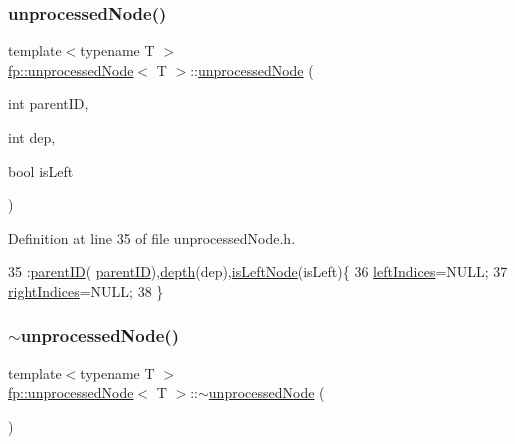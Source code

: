 \subsubsection{\texorpdfstring{unprocessed\+Node()}{unprocessedNode()}\hspace{0.1cm}{\footnotesize\ttfamily [2/4]}}
{\footnotesize\ttfamily template$<$typename T $>$ \\
\hyperlink{classfp_1_1unprocessedNode}{fp\+::unprocessed\+Node}$<$ T $>$\+::\hyperlink{classfp_1_1unprocessedNode}{unprocessed\+Node} (\begin{DoxyParamCaption}\item[{int}]{parent\+ID,  }\item[{int}]{dep,  }\item[{bool}]{is\+Left }\end{DoxyParamCaption})\hspace{0.3cm}{\ttfamily [inline]}}



Definition at line 35 of file unprocessed\+Node.\+h.


\begin{DoxyCode}
35                                                                    :\hyperlink{classfp_1_1unprocessedNode_a74cb75f76c24622444e531a583b75c3d}{parentID}(
      \hyperlink{classfp_1_1unprocessedNode_a74cb75f76c24622444e531a583b75c3d}{parentID}),\hyperlink{classfp_1_1unprocessedNode_a22ebfbc35a57e2d30b81220c94f4d0d3}{depth}(dep),\hyperlink{classfp_1_1unprocessedNode_a81b74c36ed1ac15d367e135e2fa0ba3d}{isLeftNode}(isLeft)\{
36                     \hyperlink{classfp_1_1unprocessedNode_a8e39fa0144bbb78fd02d1973bd05b5f6}{leftIndices}=NULL;
37                     \hyperlink{classfp_1_1unprocessedNode_ac6886f626536370b1276374d4939291e}{rightIndices}=NULL;
38                 \}
\end{DoxyCode}
\mbox{\label{classfp_1_1unprocessedNode_a3242b54f6a1613c61ffa989b92501ab9}} 
\subsubsection{\texorpdfstring{$\sim$unprocessed\+Node()}{~unprocessedNode()}\hspace{0.1cm}{\footnotesize\ttfamily [1/2]}}
{\footnotesize\ttfamily template$<$typename T $>$ \\
\hyperlink{classfp_1_1unprocessedNode}{fp\+::unprocessed\+Node}$<$ T $>$\+::$\sim$\hyperlink{classfp_1_1unprocessedNode}{unprocessed\+Node} (\begin{DoxyParamCaption}{ }\end{DoxyParamCaption})\hspace{0.3cm}{\ttfamily [inline]}}



